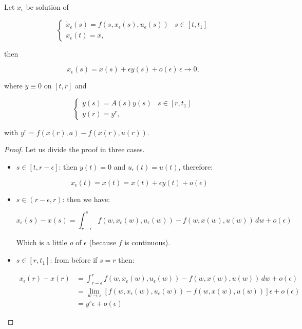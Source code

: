 \begin{lemma}
    Let $x_{\epsilon}$ be solution of

    \begin{equation}\label{1-proofpontry-dynamprob}
        \begin{cases}
            \dot{x}_{\epsilon}(s) = f(s,x_{\epsilon}(s),u_{\epsilon}(s)) & s\in[t,t_1] \\
            x_{\epsilon}(t) = x,
        \end{cases}
    \end{equation}

    then

    \begin{equation}\label{1-proofpontry-solvar}
        x_{\epsilon}(s) = x(s) + \epsilon y(s) + o(\epsilon)\, \epsilon\to0,
    \end{equation}

    where $y\equiv0$ on $[t,r]$ and

    \begin{equation}
        \begin{cases}
            \dot{y}(s) = A(s)y(s) & s\in[r,t_1]\\
            y(r) = y^r,
        \end{cases}
    \end{equation}

    with $y^r=f(x(r),a)-f(x(r),u(r))$.

    \begin{proof}
        Let us divide the proof in three cases.

        \begin{itemize}
            \item $s\in[t,r-\epsilon]$: then $y(t)=0$ and $u_{\epsilon}(t)=u(t)$, therefore:
            
            \[x_{\epsilon}(t)=x(t)=x(t)+\epsilon y(t)+o(\epsilon)\]

            \item $s\in(r-\epsilon,r)$: then we have:
            
            \[x_{\epsilon}(s)-x(s) = \int_{r-\epsilon}^s f(w,x_{\epsilon}(w),u_{\epsilon}(w))-f(w,x(w),u(w)) \,dw + o(\epsilon)\]

            Which is a little \textit{o} of $\epsilon$ (because $f$ is continuous). 

            \item $s\in[r,t_1]$: from before if $s=r$ then:
            
            \begin{align*}
                x_{\epsilon}(r)-x(r) & = \int_{r-\epsilon}^r f(w,x_{\epsilon}(w),u_{\epsilon}(w))-f(w,x(w),u(w)) \,dw + o(\epsilon) \\
                & = \lim_{w\to s}[f(w,x_{\epsilon}(w),u_{\epsilon}(w))-f(w,x(w),u(w))]\epsilon+ o(\epsilon) \\
                & = y^s\epsilon + o(\epsilon)
            \end{align*}


\end{itemize}
\end{proof}
\end{lemma}
